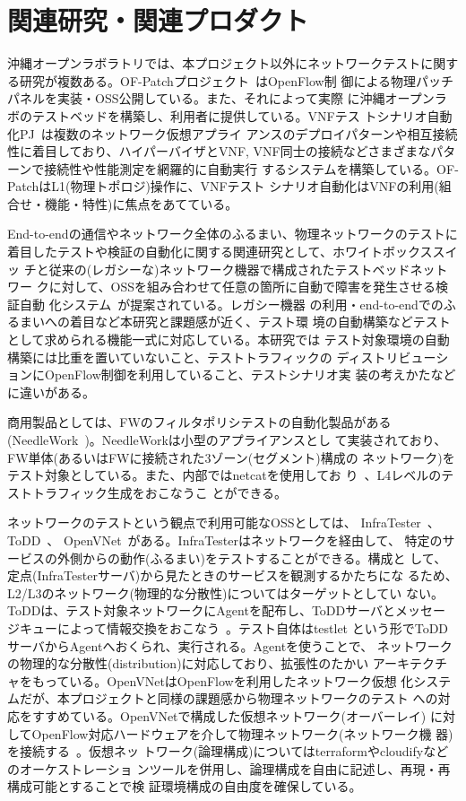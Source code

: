  \section{関連研究・関連プロダクト}
 \label{sec:related-research}

沖縄オープンラボラトリでは、本プロジェクト以外にネットワークテストに関す
る研究が複数ある。OF-Patchプロジェクト~\cite{ool-testbedpj}はOpenFlow制
御による物理パッチパネルを実装・OSS公開している。また、それによって実際
に沖縄オープンラボのテストベッドを構築し、利用者に提供している。VNFテス
トシナリオ自動化PJ~\cite{ool-vnftestpj}は複数のネットワーク仮想アプライ
アンスのデプロイパターンや相互接続性に着目しており、ハイパーバイザとVNF,
VNF同士の接続などさまざまなパターンで接続性や性能測定を網羅的に自動実行
するシステムを構築している。OF-PatchはL1(物理トポロジ)操作に、VNFテスト
シナリオ自動化はVNFの利用(組合せ・機能・特性)に焦点をあてている。

End-to-endの通信やネットワーク全体のふるまい、物理ネットワークのテストに
着目したテストや検証の自動化に関する関連研究として、ホワイトボックススイッ
チと従来の(レガシーな)ネットワーク機器で構成されたテストベッドネットワー
クに対して、OSSを組み合わせて任意の箇所に自動で障害を発生させる検証自動
化システム~\cite{wbsw-oss-test-automation}が提案されている。レガシー機器
の利用・end-to-endでのふるまいへの着目など本研究と課題感が近く、テスト環
境の自動構築などテストとして求められる機能一式に対応している。本研究では
テスト対象環境の自動構築には比重を置いていないこと、テストトラフィックの
ディストリビューションにOpenFlow制御を利用していること、テストシナリオ実
装の考えかたなどに違いがある。

商用製品としては、FWのフィルタポリシテストの自動化製品がある
(NeedleWork~\cite{needlework-web})。NeedleWorkは小型のアプライアンスとし
て実装されており、FW単体(あるいはFWに接続された3ゾーン(セグメント)構成の
ネットワーク)をテスト対象としている。また、内部ではnetcatを使用してお
り~\cite{needlework-slide}、L4レベルのテストトラフィック生成をおこなうこ
とができる。

ネットワークのテストという観点で利用可能なOSSとしては、
InfraTester~\cite{infratester-github}、ToDD~\cite{todd-github}、
OpenVNet~\cite{openvnet-web}がある。InfraTesterはネットワークを経由して、
特定のサービスの外側からの動作(ふるまい)をテストすることができる。構成と
して、定点(InfraTesterサーバ)から見たときのサービスを観測するかたちにな
るため、L2/L3のネットワーク(物理的な分散性)についてはターゲットとしてい
ない。ToDDは、テスト対象ネットワークにAgentを配布し、ToDDサーバとメッセー
ジキューによって情報交換をおこなう~\cite{todd-blog}。テスト自体はtestlet
という形でToDDサーバからAgentへおくられ、実行される。Agentを使うことで、
ネットワークの物理的な分散性(distribution)に対応しており、拡張性のたかい
アーキテクチャをもっている。OpenVNetはOpenFlowを利用したネットワーク仮想
化システムだが、本プロジェクトと同様の課題感から物理ネットワークのテスト
への対応をすすめている。OpenVNetで構成した仮想ネットワーク(オーバーレイ)
に対してOpenFlow対応ハードウェアを介して物理ネットワーク(ネットワーク機
器)を接続する~\cite{openvnet-slide,network-testing-sdn-atmarkit}。仮想ネッ
トワーク(論理構成)についてはterraformやcloudifyなどのオーケストレーショ
ンツールを併用し、論理構成を自由に記述し、再現・再構成可能とすることで検
証環境構成の自由度を確保している。

